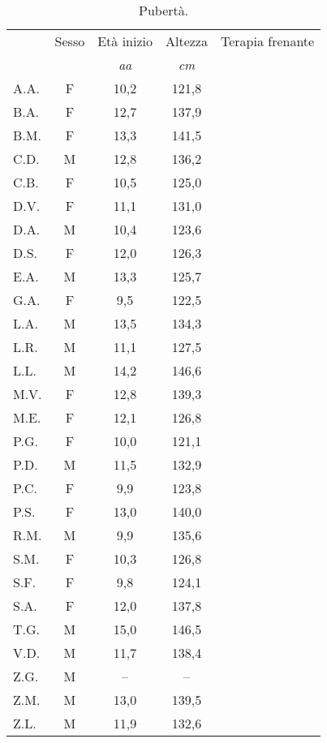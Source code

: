 \begin{table}[!h]
\begin{center}
\begin{tabular}{lcccc}
\toprule
 & Sesso 	& \multicolumn{1}{c}{Età inizio}	& Altezza	& Terapia frenante \\
 & &  \multicolumn{1}{c}{\emph{aa}} 	& \multicolumn{1}{c}{\emph{cm}}			\\
\midrule
A.A.	& F & 10,2 		& 121,8  		& \checkmark \\
B.A.	& F & 12,7 		& 137,9   		&            \\
B.M.	& F & 13,3 		& 141,5   		&            \\
C.D.	& M & 12,8 		& 136,2   		&            \\
C.B.	& F & 10,5 		& 125,0   		& \checkmark \\
D.V.	& F & 11,1 		& 131,0   		&            \\
D.A.	& M & 10,4 		& 123,6   		& \checkmark \\
D.S.	& F & 12,0 		& 126,3   		&            \\
E.A.	& M & 13,3		& 125,7   		&            \\
G.A.	& F &  9,5  	& 122,5   		&            \\
L.A.	& M & 13,5 		& 134,3   		&            \\
L.R.	& M & 11,1 		& 127,5   		&            \\
L.L.	& M & 14,2 		& 146,6   		&            \\
M.V.	& F & 12,8 		& 139,3   		&            \\
M.E.	& F & 12,1 		& 126,8   		&            \\
P.G.	& F & 10,0 		& 121,1   		& \checkmark \\
P.D.	& M & 11,5 		& 132,9   		&            \\
P.C.	& F &  9,9  		& 123,8   		& \checkmark \\
P.S.	& F & 13,0 		& 140,0   		&            \\
R.M.	& M &  9,9  		& 135,6   		& \checkmark \\
S.M.	& F & 10,3 		& 126,8   		& \checkmark \\
S.F.	& F &  9,8  		& 124,1   		&            \\
S.A.	& F & 12,0 		& 137,8   		&            \\
T.G.    & M & 15,0      & 146,5         &            \\ 
V.D.	& M & 11,7 		& 138,4   		&            \\
Z.G.	& M &  --    		& --   		&            \\
Z.M.	& M & 13,0 		& 139,5   		&            \\
Z.L.	& M & 11,9 		& 132,6   		&            \\
\bottomrule
\end{tabular}
\end{center}
\caption{Pubertà.}
\label{tab:Puberta}
\end{table}


